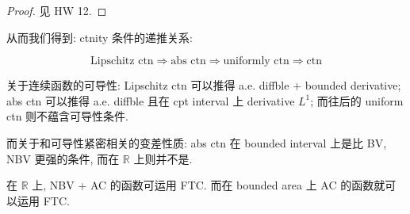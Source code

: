 \documentclass{qlnotes-export}
\begin{document}
\begin{proof}

见 HW 12.

\end{proof}

从而我们得到: ctnity 条件的递推关系:

\[\text{Lipschitz ctn}\Longrightarrow\text{abs ctn}\Longrightarrow\text{uniformly ctn}\Longrightarrow\text{ctn}\]

关于连续函数的可导性: Lipschitz ctn 可以推得 a.e. diffble \(+\) bounded derivative; abs ctn 可以推得 a.e. diffble 且在 cpt interval 上 derivative \(L^{1}\); 而往后的 uniform ctn 则不蕴含可导性条件.

而关于和可导性紧密相关的变差性质: abs ctn 在 bounded interval 上是比 BV, NBV 更强的条件, 而在 \(\mathbb{R}\) 上则并不是.

在 \(\mathbb{R}\) 上, NBV + AC 的函数可运用 FTC. 而在 bounded area 上 AC 的函数就可以运用 FTC.
\end{document}
